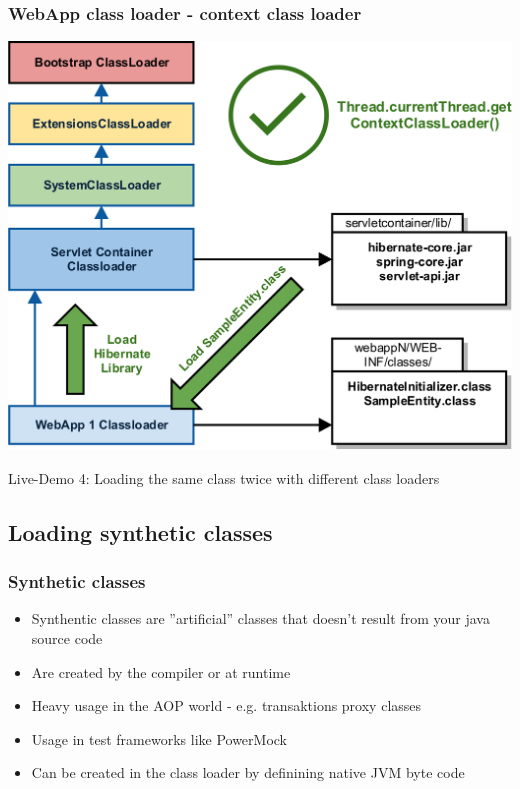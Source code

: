 \documentclass[aspectratio=169]{beamer}
\begin{document}
	\begin{frame}
		\frametitle{WebApp class loader - context class loader}
		\begin{center}
			\includegraphics[scale=0.1]{assets/contextclassloader/webappclassloader-3.png} 
		\end{center}
	\end{frame}

	\begin{frame}
		Live-Demo 4: Loading the same class twice with different class loaders
	\end{frame}

	\subsection{Loading synthetic classes}

	\begin{frame}
		\frametitle{Synthetic classes}
		\begin{itemize}
			\item{Synthentic classes are ''artificial'' classes that doesn't result from your java source code}
			\item{Are created by the compiler or at runtime}
			\item{Heavy usage in the AOP world - e.g. transaktions proxy classes}
			\item{Usage in test frameworks like PowerMock}
			\item{Can be created in the class loader by definining native JVM byte code}
		\end{itemize}
	\end{frame}
\end{document}
